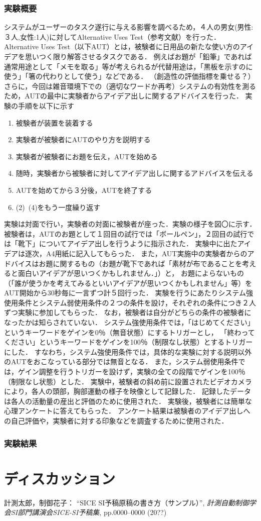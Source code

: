 \documentclass[a4paper]{jarticle}
\begin{document}
\subsubsection{実験概要}
システムがユーザーのタスク遂行に与える影響を調べるため，４人の男女(男性:３人,女性:1人)に対してAlternative Uses Test（参考文献）を行った．
Alternative Uses Test（以下AUT）とは，被験者に日用品の新たな使い方のアイデアを思いつく限り解答させるタスクである．
例えばお題が「鉛筆」であれば通常用途として「メモを取る」等が考えられるが代替用途は，「黒板を示すのに使う」「箸の代わりとして使う」などである．
（創造性の評価指標を乗せる？）
さらに，今回は雑音環境下での（適切なワードか再考）システムの有効性を測るため，AUTの最中に実験者からアイデア出しに関するアドバイスを行った．
実験の手順を以下に示す
\begin{enumerate}
    \item 被験者が装置を装着する
    \item 実験者が被験者にAUTのやり方を説明する
    \item 実験者が被験者にお題を伝え，AUTを始める
    \item 随時，実験者から被験者に対してアイデア出しに関するアドバイスを伝える
    \item AUTを始めてから３分後，AUTを終了する
    \item (2)~(4)をもう一度繰り返す
\end{enumerate}
実験は対面で行い，実験者の対面に被験者が座った．実験の様子を図〇に示す．
被験者は，AUTのお題として１回目の試行では「ボールペン」，２回目の試行では「靴下」についてアイデア出しを行うように指示された．
実験中に出たアイデアは逐次，A4用紙に記入してもらった．
また，AUT実施中の実験者からのアドバイスはお題に関するもの（お題が靴下であれば「素材が布であることを考えると面白いアイデアが思いつくかもしれません．」）と，
お題によらないもの（「誰が使うかを考えてみるといいアイデアが思いつくかもしれません」等）をAUT開始から30秒毎に一言ずつ計５回行った．
実験を行うにあたりシステム強使用条件とシステム弱使用条件の２つの条件を設け，それぞれの条件につき２人ずつ実験に参加してもらった．
なお，被験者は自分がどちらの条件の被験者になったかは知らされていない．
システム強使用条件では，「はじめてください」というキーワードをゲインを0％（無音状態）にするトリガーとし，
「終わってください」というキーワードをゲインを100％（制限なし状態）とするトリガーにした．
すなわち，システム強使用条件では，具体的な実験に対する説明以外のAUTをおこなっている部分では無音となる．
また，システム弱使用条件では，ゲイン調整を行うトリガーを設けず，実験の全ての段階でゲインを100％（制限なし状態）とした．
実験中，被験者の斜め前に設置されたビデオカメラにより，各人の頭部，胸部運動の様子を映像として記録した．
記録したデータは各人の活動量の産出と評価のために使用された．
実験後，被験者には簡単な心理アンケートに答えてもらった．
アンケート結果は被験者のアイデア出しへの自己評価や，実験者に対する印象などを調査するために使用された．
\subsubsection{実験結果}
\section{ディスカッション}
%
%
\begin{thebibliography}{99}
	計測太郎，制御花子：
	``SICE SI予稿原稿の書き方（サンプル）'',  
   {\it 計測自動制御学会SI部門講演会SICE-SI予稿集}, 
    pp.0000--0000 (20??)
\end{thebibliography}
%
%
%
\end{document}
